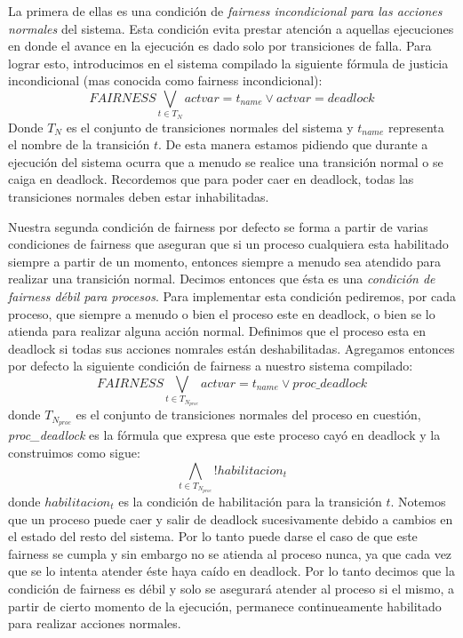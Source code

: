 \documentclass[titlepage, 12pt]{book}
\begin{document}
La primera de ellas es una condici\'on de \textit{fairness incondicional para las acciones normales} del sistema. Esta condici\'on evita prestar atenci\'on a aquellas ejecuciones en donde el avance en la ejecuci\'on es dado solo por transiciones de falla. Para lograr esto, introducimos en el sistema compilado la siguiente f\'ormula de justicia incondicional (mas conocida como fairness incondicional):
$$FAIRNESS \bigvee_{t \in T_N} actvar = t_{name} \vee actvar = deadlock$$
Donde $T_N$ es el conjunto de transiciones normales del sistema y $t_{name}$ representa el nombre de la transici\'on $t$. De esta manera estamos pidiendo que durante a ejecuci\'on del sistema ocurra que a menudo se realice una transici\'on normal o se caiga en deadlock. Recordemos que para poder caer en deadlock, todas las transiciones normales deben estar inhabilitadas.

Nuestra segunda condici\'on de fairness por defecto se forma a partir de varias condiciones de fairness que aseguran que si un proceso cualquiera esta habilitado siempre a partir de un momento, entonces siempre a menudo sea atendido para realizar una transici\'on normal. Decimos entonces que \'esta es una \textit{condici\'on de fairness d\'ebil para procesos}. Para implementar esta condici\'on pediremos, por cada proceso, que siempre a menudo o bien el proceso este en deadlock, o bien se lo atienda para realizar alguna acci\'on normal. Definimos que el proceso esta en deadlock si todas sus acciones nomrales est\'an deshabilitadas. Agregamos entonces por defecto la siguiente condici\'on de fairness a nuestro sistema compilado:
$$FAIRNESS \bigvee_{t \in T_{N_{proc}}} actvar = t_{name} \vee proc\_deadlock$$
donde $T_{N_{proc}}$ es el conjunto de transiciones normales del proceso en cuesti\'on, \textit{proc\_deadlock} es la f\'ormula que expresa que este proceso cay\'o en deadlock y la construimos como sigue:
$$\bigwedge_{t \in T_{N_{proc}}}! habilitacion_{t}$$
donde $habilitacion_{t}$ es la condici\'on de habilitaci\'on para la transici\'on $t$. Notemos que un proceso puede caer y salir de deadlock sucesivamente debido a cambios en el estado del resto del sistema. Por lo tanto puede darse el caso de que este fairness se cumpla y sin embargo no se atienda al proceso nunca, ya que cada vez que se lo intenta atender \'este haya ca\'ido en deadlock. Por lo tanto decimos que la condici\'on de fairness es d\'ebil y solo se asegurar\'a atender al proceso si el mismo, a partir de cierto momento de la ejecuci\'on, permanece continueamente habilitado para realizar acciones normales.
\end{document}
